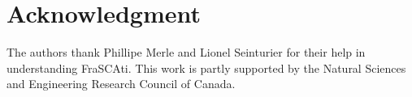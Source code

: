 \vspace{0.2cm}
\section*{Acknowledgment}
\vspace{0.2cm}
The authors thank Phillipe Merle and Lionel Seinturier for
their help in understanding FraSCAti. This work is partly supported by the Natural Sciences and Engineering Research Council of Canada. 
\vspace{0.2cm}